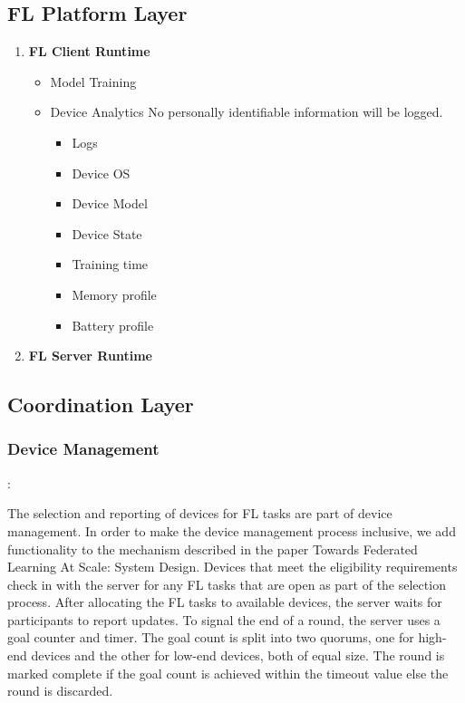         \subsection{FL Platform Layer}
        \begin{enumerate}
            \item \textbf{FL Client Runtime}
                \begin{itemize}
                    \item Model Training
                    \item Device Analytics \newline
                        No personally identifiable information will be logged.  
                        \begin{itemize}
                            \item Logs
                            \item Device OS
                            \item Device Model
                            \item Device State
                            \item Training time
                            \item Memory profile
                            \item Battery profile
                        \end{itemize}
                \end{itemize}
            \item \textbf{FL Server Runtime}

        \end{enumerate}
    \subsection{Coordination Layer}
        \subsubsection{Device Management}:

        The selection and reporting of devices for FL tasks are part of device management. In order to make the device management process inclusive, we add functionality to the mechanism described in the paper Towards Federated Learning At Scale: System Design. Devices that meet the eligibility requirements check in with the server for any FL tasks that are open as part of the selection process. After allocating the FL tasks to available devices, the server waits for participants to report updates. To signal the end of a round, the server uses a goal counter and timer. The goal count is split into two quorums, one for high-end devices and the other for low-end devices, both of equal size. The round is marked complete if the goal count is achieved within the timeout value else the round is discarded.\\
